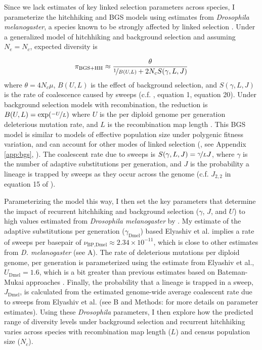 \documentclass[9pt,lineno]{elife}
\begin{document}
Since we lack estimates of key linked selection parameters across species, I
parameterize the hitchhiking and BGS models using estimates from
\emph{Drosophila melanogaster}, a species known to be strongly affected by
linked selection \citep{Sella2009-nx}. Under a generalized model of
hitchhiking and background selection \citep{Elyashiv2016-vt,Coop2012-cd}
and assuming $N_e = N_c$, expected diversity is

\begin{align} 
  \pi_\text{BGS+HH} \approx \frac{\theta}{\nicefrac{1}{B(U, L)} + 2N_c S(\gamma, L, J)} 
  \label{eqn:div} 
\end{align}
%
where $\theta = 4N_c\mu$, $B(U,L)$ is the effect of background selection, and
$S(\gamma, L, J)$ is the rate of coalescence caused by sweeps (c.f.
\cite{Elyashiv2016-vt}, equation 1, \cite{Coop2012-cd} equation 20). Under
background selection models with recombination, the reduction is $B(U,L) =
\exp(\nicefrac{-U}{L})$ where $U$ is the per diploid genome per generation
deleterious mutation rate, and $L$ is the recombination map length
\citep{Hudson1994-oh,Hudson1995-xc,Nordborg1996-nq}. This BGS model is
similar to models of effective population size under polygenic fitness
variation, and can account for other modes of linked selection
(\cite{Robertson1961-ho,Santiago1995-hx,Santiago1998-bs}, see Appendix 
\ref{app:bgs}, ). The coalescent rate due to sweeps is $S(\gamma, L, J) =
\nicefrac{\gamma}{L} J$, where $\gamma$ is the number of adaptive substitutions
per generation, and $J$ is the probability a lineage is trapped by sweeps as
they occur across the genome (c.f. $J_{2,2}$ in equation 15 of
\cite{Coop2012-cd}). 

Parameterizing the model this way, I then set the key parameters that determine
the impact of recurrent hitchhiking and background selection ($\gamma$, $J$,
and $U$) to high values estimated from \emph{Drosophila melanogaster} by
\cite{Elyashiv2016-vt}. My estimate of the adaptive substitutions per
generation ($\gamma_\text{Dmel}$) based Elyashiv et al. implies a rate of
sweeps per basepair of $\nu_\text{BP,Dmel} \approx 2.34 \times 10^{-11}$, which
is close to other estimates from \emph{D.  melanogaster} (see
A). The rate of deleterious mutations per
diploid genome, per generation is parameterized using the estimate from
Elyashiv et al., $U_\text{Dmel} = 1.6$, which is a bit greater than previous
estimates based on Bateman-Mukai approaches
\citep{Mukai1985-bc,Mukai1988-vs,Charlesworth1987-ab}. Finally, the probability
that a lineage is trapped in a sweep, $J_\text{Dmel}$, is calculated from the
estimated genome-wide average coalescent rate due to sweeps from Elyashiv et
al. (see B and Methods:
 for more details on parameter estimates).
Using these \emph{Drosophila} parameters, I then explore how the predicted
range of diversity levels under background selection and recurrent hitchhiking
varies across species with recombination map length ($L$) and census population
size ($N_c$).
\end{document}
